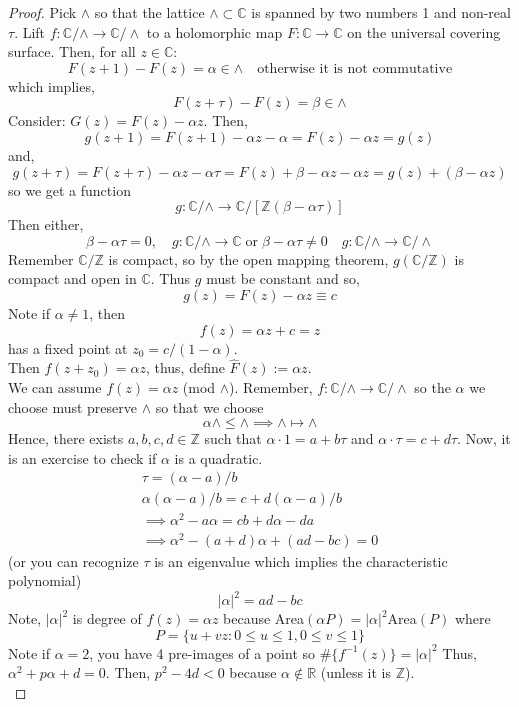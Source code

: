 \documentclass[a4paper, 11pt]{book}
\theoremstyle{definition}
\theoremstyle{remark}
\begin{document}
    \begin{proof}
        Pick $\wedge$ so that the lattice $\wedge\subset\mathbb{C}$ is spanned by two numbers 1 and non-real $\tau$. Lift
        $f:\mathbb{C}/\wedge\to\mathbb{C}/\wedge$ to a holomorphic map $F:\mathbb{C}\to\mathbb{C}$ on the universal covering surface.
        Then, for all $z\in\mathbb{C}$:
         \[ F(z+1) - F(z) = \alpha\in\wedge\quad\text{otherwise it is not commutative} \]
         which implies,
         \[ F(z+\tau) - F(z) = \beta\in\wedge \]
         Consider: $G(z) = F(z) - \alpha z$. Then,
         \[ g(z+1) = F(z+1) - \alpha z - \alpha = F(z) - \alpha z = g(z) \]
         and,
         \[ g(z+\tau) = F(z+\tau) - \alpha z - \alpha\tau = F(z) + \beta - \alpha z - \alpha z = g(z) + (\beta - \alpha z) \]
         so we get a function
         \[ g: \mathbb{C}/\wedge \to \mathbb{C}/[\mathbb{Z}(\beta-\alpha\tau)] \]
         Then either,
         \[ \beta - \alpha\tau = 0,\quad g:\mathbb{C}/\wedge \to\mathbb{C}\;\text{or}\; \beta-\alpha\tau\neq 0\quad g:\mathbb{C}/\wedge\to
             \mathbb{C}/\wedge \]
         Remember $\mathbb{C}/\mathbb{Z}$ is compact, so by the open mapping theorem, $g(\mathbb{C}/\mathbb{Z})$ is compact and open
         in $\mathbb{C}$. Thus $g$ must be constant and so,
         \[ g(z) = F(z) - \alpha z \equiv c \]
         Note if $\alpha\neq 1$, then
         \[ f(z) = \alpha z + c = z \]
         has a fixed point at $z_0 = c/(1-\alpha)$.\\
         Then $f(z+z_0) = \alpha z$, thus, define $\hat{F}(z) := \alpha z$.\\
         We can assume $f(z) = \alpha z$ (mod $\wedge$). Remember, $f:\mathbb{C}/\wedge\to \mathbb{C}/\wedge$ so the $\alpha$ we
         choose must preserve $\wedge$ so that we choose
         \[ \alpha\wedge \leq \wedge \implies \wedge \mapsto \wedge \]
         Hence, there exists $a,b,c,d\in\mathbb{Z}$ such that $\alpha \cdot 1 = a + b\tau$ and $\alpha\cdot\tau = c+d\tau$.
         Now, it is an exercise to check if $\alpha$ is a quadratic.
         \begin{align*}
             \tau = (\alpha - a)/b \\
             \alpha(\alpha - a)/b = c + d(\alpha - a)/b \\
             \implies \alpha^2 -a\alpha = cb + d\alpha - da\\
             \implies \alpha^2 - (a+d)\alpha + (ad-bc) = 0
         \end{align*}
         (or you can recognize $\tau$ is an eigenvalue which implies the characteristic polynomial)
         \[ |\alpha|^2 = ad - bc\]
         Note, $|\alpha|^2$ is degree of $f(z) = \alpha z$ because Area$(\alpha P) = |\alpha|^2$Area$(P)$ where
         \[ P = \{u + vz: 0\leq u\leq 1, 0\leq v\leq 1\} \]
         Note if $\alpha = 2$, you have 4 pre-images of a point so $\#\{f^{-1}(z)\} = |\alpha|^2$
         Thus, $\alpha^2 + p\alpha + d =0$. Then, $p^2 -4d < 0$ because $\alpha\not\in\mathbb{R}$ (unless it is $\mathbb{Z}$).\\


\end{proof}
\end{document}
